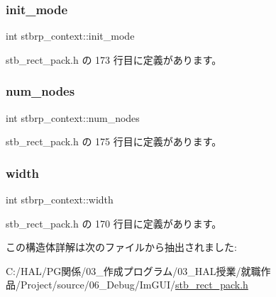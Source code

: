 \subsubsection{\texorpdfstring{init\+\_\+mode}{init\_mode}}
{\footnotesize\ttfamily int stbrp\+\_\+context\+::init\+\_\+mode}



 stb\+\_\+rect\+\_\+pack.\+h の 173 行目に定義があります。

\mbox{\label{structstbrp__context_afa8105d4ef6d3e0ae5aaf8e1ed4b2c58}} 
\subsubsection{\texorpdfstring{num\+\_\+nodes}{num\_nodes}}
{\footnotesize\ttfamily int stbrp\+\_\+context\+::num\+\_\+nodes}



 stb\+\_\+rect\+\_\+pack.\+h の 175 行目に定義があります。

\mbox{\label{structstbrp__context_a70cfcb2044ce8397cc440d28b30c09b2}} 
\subsubsection{\texorpdfstring{width}{width}}
{\footnotesize\ttfamily int stbrp\+\_\+context\+::width}



 stb\+\_\+rect\+\_\+pack.\+h の 170 行目に定義があります。



この構造体詳解は次のファイルから抽出されました\+:\begin{DoxyCompactItemize}
\item 
C\+:/\+H\+A\+L/\+P\+G関係/03\+\_\+作成プログラム/03\+\_\+\+H\+A\+L授業/就職作品/\+Project/source/06\+\_\+\+Debug/\+Im\+G\+U\+I/\mbox{\hyperlink{stb__rect__pack_8h}{stb\+\_\+rect\+\_\+pack.\+h}}\end{DoxyCompactItemize}

